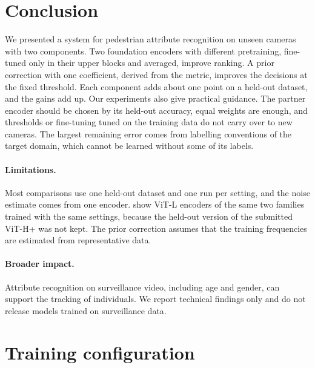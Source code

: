 \documentclass[10pt,twocolumn,letterpaper]{article}
\begin{document}
\section{Conclusion}
\label{sec:conclusion}

We presented a system for pedestrian attribute recognition on unseen cameras with two components. Two foundation encoders with different pretraining, fine-tuned only in their upper blocks and averaged, improve ranking. A prior correction with one coefficient, derived from the metric, improves the decisions at the fixed threshold. Each component adds about one point on a held-out dataset, and the gains add up. Our experiments also give practical guidance. The partner encoder should be chosen by its held-out accuracy, equal weights are enough, and thresholds or fine-tuning tuned on the training data do not carry over to new cameras. The largest remaining error comes from labelling conventions of the target domain, which cannot be learned without some of its labels.

\paragraph{Limitations.}\label{sec:limits} Most comparisons use one held-out dataset and one run per setting, and the noise estimate comes from one encoder.  show ViT-L encoders of the same two families trained with the same settings, because the held-out version of the submitted ViT-H+ was not kept. The prior correction assumes that the training frequencies are estimated from representative data.

\paragraph{Broader impact.} Attribute recognition on surveillance video, including age and gender, can support the tracking of individuals. We report technical findings only and do not release models trained on surveillance data.

{\small


}

\clearpage
\appendix
\section{Training configuration}
\label{app:config}
\end{document}
